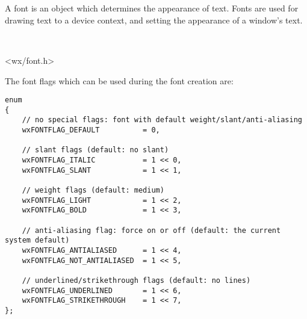 \section{}\label{wxfont}

A font is an object which determines the appearance of text. Fonts are
used for drawing text to a device context, and setting the appearance of
a window's text.


\\


<wx/font.h>


The font flags which can be used during the font creation are:
\begin{verbatim}
enum
{
    // no special flags: font with default weight/slant/anti-aliasing
    wxFONTFLAG_DEFAULT          = 0,

    // slant flags (default: no slant)
    wxFONTFLAG_ITALIC           = 1 << 0,
    wxFONTFLAG_SLANT            = 1 << 1,

    // weight flags (default: medium)
    wxFONTFLAG_LIGHT            = 1 << 2,
    wxFONTFLAG_BOLD             = 1 << 3,

    // anti-aliasing flag: force on or off (default: the current system default)
    wxFONTFLAG_ANTIALIASED      = 1 << 4,
    wxFONTFLAG_NOT_ANTIALIASED  = 1 << 5,

    // underlined/strikethrough flags (default: no lines)
    wxFONTFLAG_UNDERLINED       = 1 << 6,
    wxFONTFLAG_STRIKETHROUGH    = 1 << 7,
};
\end{verbatim}

